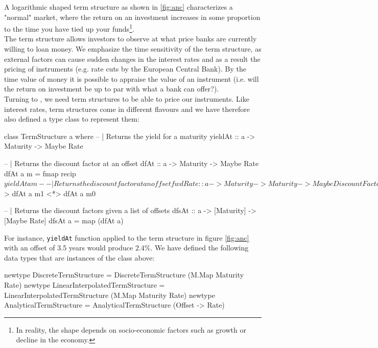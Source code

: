 A logarithmic shaped term structure as shown in \ref{fig:anc} characterizes a
"normal" market, where the return on an investment increases in some proportion
to the time you have tied up your funds\footnote{In reality, the shape depends on 
socio-economic factors such as growth or decline in the economy.}.\\

The term structure allows investors to observe at what price banks are
currently willing to loan money. We emphasize the time sensitivity of the term
structure, as external factors can cause sudden changes in the interest
rates and as a result the pricing of instruments (e.g. rate cuts by the
European Central Bank). By the time value of money it is possible to
appraise the value of an instrument (i.e. will the return on investment
be up to par with what a bank can offer?).\\

Turning to \hql, we need term structures to be able to price our instruments.
Like interest rates, term structures come in different flavours and we 
have therefore also defined a type class to represent them:

\begin{hscode}
class TermStructure a where
  -- | Returns the yield for a maturity
  yieldAt :: a -> Maturity -> Maybe Rate

  -- | Returns the discount factor at an offset
  dfAt :: a -> Maturity -> Maybe Rate
  dfAt a m = fmap recip $ yieldAt a m
 
  -- | Returns the discount factor at an offset
  fwdRate :: a -> Maturity -> Maturity -> Maybe DiscountFactor
  fwdRate a m0 m1 = (/) <$> dfAt a m1 <*> dfAt a m0
  
  -- | Returns the discount factors given a list of offsets
  dfsAt :: a -> [Maturity] -> [Maybe Rate]
  dfsAt a = map (dfAt a)
\end{hscode}

For instance, \texttt{yieldAt} function applied to the term structure in
figure \ref{fig:anc} with an offset of 3.5 years would produce $2.4\%$. We have
defined the following data types that are instances of the class above:

\begin{hscode}
newtype DiscreteTermStructure
  = DiscreteTermStructure (M.Map Maturity Rate)
newtype LinearInterpolatedTermStructure
  = LinearInterpolatedTermStructure (M.Map Maturity Rate)
newtype AnalyticalTermStructure
  = AnalyticalTermStructure (Offset -> Rate)
\end{hscode}

